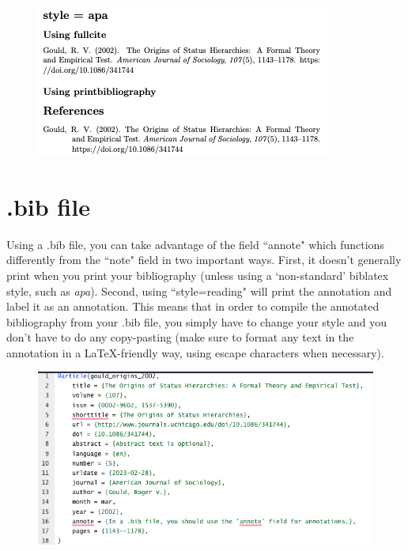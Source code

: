 \documentclass{article}
\begin{document}
\begin{figure}[!ht]
\centering
\includegraphics{screenshots/Mendeley3a.png}
\end{figure}

\FloatBarrier
\section*{.bib file}

Using a .bib file, you can take advantage of the field ``annote" which functions differently from the ``note" field in two important ways. First, it doesn't generally print when you print your bibliography (unless using a `non-standard' biblatex style, such as \textit{apa}). Second, using ``style=reading"  will print the annotation and label it as an annotation. This means that in order to compile the annotated bibliography from your .bib file, you simply have to change your style and you don't have to do any copy-pasting (make sure to format any text in the annotation in a LaTeX-friendly way, using escape characters when necessary).

\begin{figure}[!ht]
\centering
\includegraphics[width=\textwidth]{screenshots/Bib2.png}
\end{figure}
\end{document}
